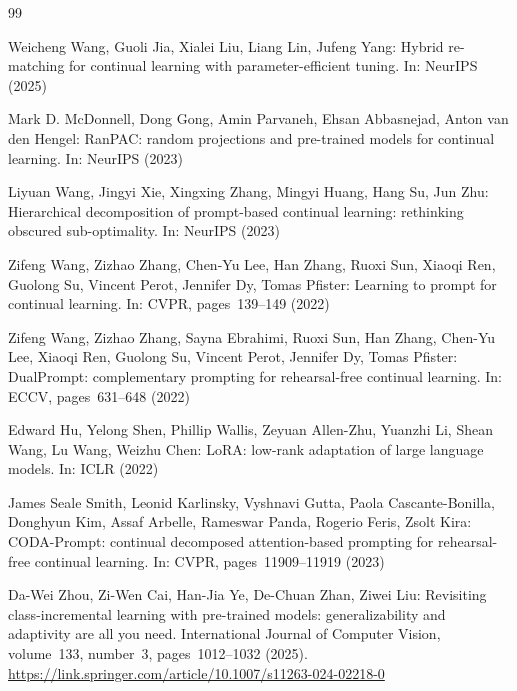 \documentclass[runningheads]{llncs}
\begin{document}
\begin{thebibliography}{99}

Weicheng Wang, Guoli Jia, Xialei Liu, Liang Lin, Jufeng Yang: Hybrid re-matching for continual
learning with parameter-efficient tuning. In: NeurIPS (2025)

Mark D. McDonnell, Dong Gong, Amin Parvaneh, Ehsan Abbasnejad,
Anton van den Hengel:
RanPAC: random projections and pre-trained models for continual learning. In:
NeurIPS (2023)

Liyuan Wang, Jingyi Xie, Xingxing Zhang, Mingyi Huang, Hang Su, Jun Zhu: Hierarchical
decomposition of prompt-based continual learning: rethinking obscured
sub-optimality. In: NeurIPS (2023)

Zifeng Wang, Zizhao Zhang, Chen-Yu Lee, Han Zhang, Ruoxi Sun, Xiaoqi Ren,
Guolong Su, Vincent Perot, Jennifer Dy, Tomas Pfister: Learning to prompt for
continual learning. In: CVPR, pages~139--149 (2022)

Zifeng Wang, Zizhao Zhang, Sayna Ebrahimi, Ruoxi Sun, Han Zhang,
Chen-Yu Lee, Xiaoqi Ren, Guolong Su, Vincent Perot, Jennifer Dy,
Tomas Pfister: DualPrompt: complementary prompting for rehearsal-free continual
learning. In: ECCV, pages~631--648 (2022)

Edward Hu, Yelong Shen, Phillip Wallis, Zeyuan Allen-Zhu, Yuanzhi Li,
Shean Wang, Lu Wang, Weizhu Chen: LoRA: low-rank adaptation of large language
models. In: ICLR (2022)


James Seale Smith, Leonid Karlinsky, Vyshnavi Gutta, Paola Cascante-Bonilla,
Donghyun Kim, Assaf Arbelle, Rameswar Panda, Rogerio Feris, Zsolt Kira:
CODA-Prompt: continual decomposed attention-based prompting for rehearsal-free
continual learning. In: CVPR, pages~11909--11919 (2023)

Da-Wei Zhou, Zi-Wen Cai, Han-Jia Ye, De-Chuan Zhan, Ziwei Liu: Revisiting
class-incremental learning with pre-trained models: generalizability and
adaptivity are all you need. International Journal of Computer Vision,
volume~133, number~3, pages~1012--1032 (2025).
\url{https://link.springer.com/article/10.1007/s11263-024-02218-0}


\end{thebibliography}
\end{document}

